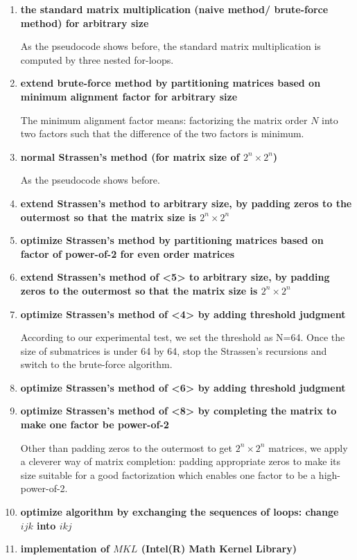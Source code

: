 \documentclass[UTF8]{ctexart}
\begin{document}
\begin{enumerate}
  \def\labelenumi{\arabic{enumi}.}
  \item
        \textbf{the standard matrix multiplication (naive method/ brute-force
          method) for arbitrary size}

        As the pseudocode shows before, the standard matrix multiplication is
        computed by three nested for-loops.
  \item
        \textbf{extend brute-force method by partitioning matrices based on
          minimum alignment factor for arbitrary size}

        The minimum alignment factor means: factorizing the matrix order \(N\)
        into two factors such that the difference of the two factors is
        minimum.
  \item
        \textbf{normal Strassen's method (for matrix size of
          \(2^n \times 2^n\))}

        As the pseudocode shows before.
  \item
        \textbf{extend Strassen's method to arbitrary size, by padding zeros
          to the outermost so that the matrix size is \(2^n\times 2^n\)}
  \item
        \textbf{optimize Strassen's method by partitioning matrices based on
          factor of power-of-2 for even order matrices}
  \item
        \textbf{extend Strassen's method of \textless5\textgreater{} to
          arbitrary size, by padding zeros to the outermost so that the matrix
          size is \(2^n\times 2^n \)}
  \item
        \textbf{optimize Strassen's method of \textless4\textgreater{} by
          adding threshold judgment}

        According to our experimental test, we set the threshold as N=64. Once
        the size of submatrices is under 64 by 64, stop the Strassen's
        recursions and switch to the brute-force algorithm.
  \item
        \textbf{optimize Strassen's method of \textless6\textgreater{} by
          adding threshold judgment}
  \item
        \textbf{optimize Strassen's method of \textless8\textgreater{} by
          completing the matrix to make one factor be power-of-2}

        Other than padding zeros to the outermost to get \(2^n\times2^n\)
        matrices, we apply a cleverer way of matrix completion: padding
        appropriate zeros to make its size suitable for a good factorization
        which enables one factor to be a high-power-of-2.
  \item
        \textbf{optimize algorithm by exchanging the sequences of loops:
          change \(ijk\) into \(ikj\)}
  \item
        \textbf{implementation of \(MKL\) (Intel(R) Math Kernel Library)}


\end{enumerate}
\end{document}
